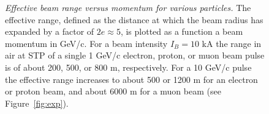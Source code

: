 \documentclass [12pt,a4paper,     ]{report} %
\begin{document}
%
\begin{figure}  
\begin{center}
\caption[Effective beam range versus momentum for various particles]{\emph{Effective beam range versus momentum for various particles.} The effective range, defined as the distance at which the beam radius has expanded by a factor of $2e \approx 5$, is plotted as a function a beam momentum in GeV/c. For a beam intensity $I_B=10$ kA the range in air at STP of a single 1 GeV/c electron, proton, or muon beam pulse is of about 200, 500, or 800 m, respectively. For a 10 GeV/c pulse the effective range increases to about 500 or 1200 m for an electron or proton beam, and about 6000 m for a muon beam (see Figure~\ref{fig:exp}). 
\label{fig:ran}}
\end{center}
\end{figure}
%
\end{document}
